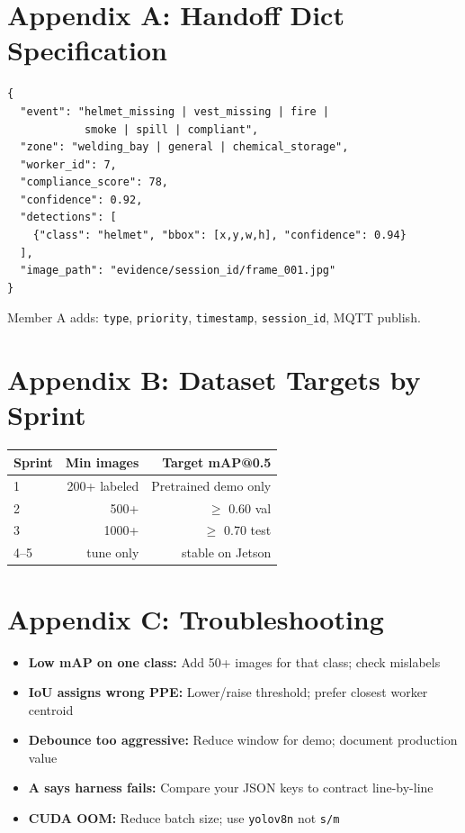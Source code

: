 \documentclass[12pt,a4paper]{report}
\begin{document}
\chapter{Appendix A: Handoff Dict Specification}

\begin{verbatim}
{
  "event": "helmet_missing | vest_missing | fire |
            smoke | spill | compliant",
  "zone": "welding_bay | general | chemical_storage",
  "worker_id": 7,
  "compliance_score": 78,
  "confidence": 0.92,
  "detections": [
    {"class": "helmet", "bbox": [x,y,w,h], "confidence": 0.94}
  ],
  "image_path": "evidence/session_id/frame_001.jpg"
}
\end{verbatim}

Member A adds: \texttt{type}, \texttt{priority}, \texttt{timestamp}, \texttt{session\_id}, MQTT publish.

\chapter{Appendix B: Dataset Targets by Sprint}

\begin{center}
\begin{tabular}{lrr}
\toprule
\textbf{Sprint} & \textbf{Min images} & \textbf{Target mAP@0.5} \\
\midrule
1 & 200+ labeled & Pretrained demo only \\
2 & 500+ & $\geq$ 0.60 val \\
3 & 1000+ & $\geq$ 0.70 test \\
4--5 & tune only & stable on Jetson \\
\bottomrule
\end{tabular}
\end{center}

\chapter{Appendix C: Troubleshooting}

\begin{itemize}
    \item \textbf{Low mAP on one class:} Add 50+ images for that class; check mislabels
    \item \textbf{IoU assigns wrong PPE:} Lower/raise threshold; prefer closest worker centroid
    \item \textbf{Debounce too aggressive:} Reduce window for demo; document production value
    \item \textbf{A says harness fails:} Compare your JSON keys to contract line-by-line
    \item \textbf{CUDA OOM:} Reduce batch size; use \texttt{yolov8n} not \texttt{s/m}
\end{itemize}
\end{document}
